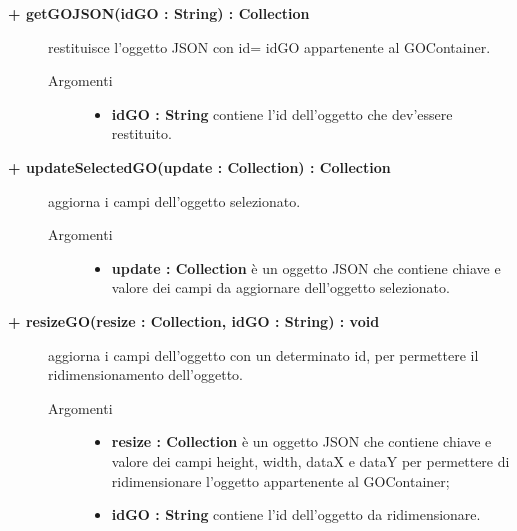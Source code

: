 \begin{description}
\begin{description}
\begin{description}
\end{description}

\end{description}


\begin{description}
		\item[\textbf{\color{blue}+ getGOJSON(idGO : String) : Collection			}] \hfill
			restituisce l'oggetto JSON con id= idGO appartenente al GOContainer.   

\begin{description}
			\item[Argomenti] \hfill
				\begin{itemize}
						\item \textbf{idGO : String			} \hfill
					contiene l'id dell'oggetto che dev'essere restituito.
				\end{itemize}

\end{description}

\end{description}

\begin{description}
		\item[\textbf{\color{blue}+ updateSelectedGO(update : Collection) : Collection			}] \hfill
			aggiorna i campi dell'oggetto selezionato.   

\begin{description}
			\item[Argomenti] \hfill
				\begin{itemize}
						\item \textbf{update : Collection			} \hfill
					è un oggetto JSON che contiene chiave e valore dei campi da aggiornare dell'oggetto selezionato.
				\end{itemize}

\end{description}

\end{description}

\begin{description}
		\item[\textbf{\color{blue}+ resizeGO(resize : Collection, idGO : String) : void			}] \hfill
			aggiorna i campi dell'oggetto con un determinato id, per permettere il ridimensionamento dell'oggetto.    

\begin{description}
			\item[Argomenti] \hfill
				\begin{itemize}
					\item \textbf{resize : Collection			} \hfill
					è un oggetto JSON che contiene chiave e valore dei campi height, width, dataX e dataY per permettere di ridimensionare l'oggetto appartenente al GOContainer;
					\item \textbf{idGO : String			} \hfill
					contiene l'id dell'oggetto da ridimensionare.
				\end{itemize}


\end{description}
\end{description}
\end{description}
